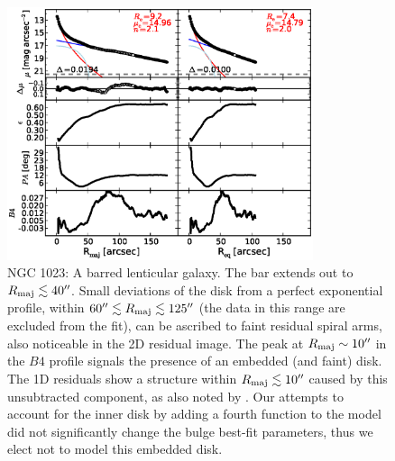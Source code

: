 \documentclass[preprint2]{emulateapj}
\newcommand{\fitfigurewidth}{0.8\textwidth}
\begin{document}
  \begin{figure}[h]
  \begin{center}
  \includegraphics[width=\fitfigurewidth]{n1023_1Dfit.eps}
  \caption{NGC 1023:
  A barred lenticular galaxy. 
  The bar extends out to $R_{\rm maj} \lesssim 40''$.
  Small deviations of the disk from a perfect exponential profile, 
  within $60'' \lesssim R_{\rm maj} \lesssim 125''$ (the data in this range are excluded from the fit), 
  can be ascribed to faint residual spiral arms, also noticeable in the 2D residual image. 
  The peak at $R_{\rm maj} \sim 10''$ in the $B4$ profile signals the presence of an embedded (and faint) disk.
  The 1D residuals show a structure within $R_{\rm maj} \lesssim 10''$ caused by this unsubtracted 
  component, as also noted by \cite{lasker2014data}.
  Our attempts to account for the inner disk by adding a fourth function to the model 
  did not significantly change the bulge best-fit parameters,
  thus we elect not to model this embedded disk. 
  }
  \end{center}
  \end{figure}
\end{document}
